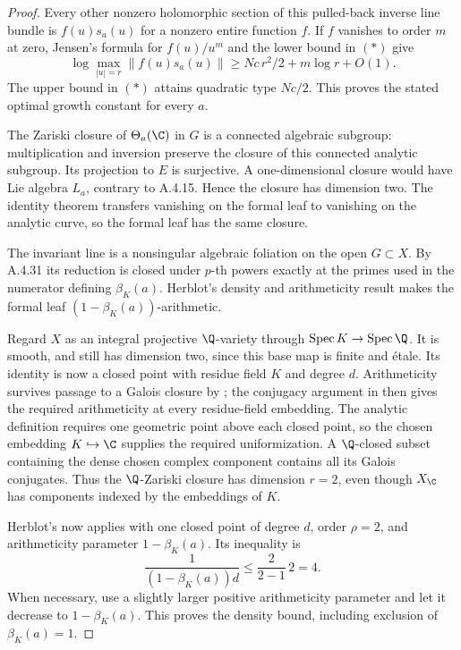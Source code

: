 \begin{proof}
Every other nonzero holomorphic section of this pulled-back
inverse line bundle is $f(u)s_a(u)$ for a nonzero entire
function $f$. If $f$ vanishes to order $m$ at zero, Jensen's
formula for $f(u)/u^m$ and the lower bound in $(*)$ give
\[
 \log\max_{|u|=r}\|f(u)s_a(u)\|
       \ge Nc\,r^2/2+m\log r+O(1).
\]
The upper bound in $(*)$ attains quadratic type $Nc/2$.
This proves the stated optimal growth constant for every $a$.

The Zariski closure of $\Theta_a(\C)$ in $G$ is a connected
algebraic subgroup: multiplication and inversion preserve
the closure of this connected analytic subgroup.
Its projection to $E$ is surjective. A one-dimensional closure
would have Lie algebra $L_a$, contrary to A.4.15. Hence the
closure has dimension two. The identity theorem transfers
vanishing on the formal leaf to vanishing on the analytic curve,
so the formal leaf has the same closure.

The invariant line is a nonsingular algebraic foliation on
the open $G\subset X$. By A.4.31 its reduction is closed under
$p$-th powers exactly at the primes used in the numerator
defining $\beta_K(a)$. Herblot's density and arithmeticity
result \cite[Definition 3.5 and Proposition 3.6, pp.20--21]{EllHerblot2012}
makes the formal leaf $(1-\beta_K(a))$-arithmetic.

Regard $X$ as an integral projective $\Q$-variety through
$\operatorname{Spec}K\to\operatorname{Spec}\Q$. It is smooth,
and still has dimension two, since this base map is finite
and \'etale. Its identity is now a closed point with residue
field $K$ and degree $d$.
Arithmeticity survives passage to a Galois closure by
\cite[Lemma 2.6]{EllHerblot2012}; the conjugacy argument
in \cite[Definition 4.6 and its remark, p.28]{EllHerblot2012}
then gives the required arithmeticity at every residue-field
embedding. The analytic definition requires one geometric
point above each closed point, so the chosen embedding
$K\hookrightarrow\C$ supplies the required uniformization.
A $\Q$-closed subset containing the dense chosen complex
component contains all its Galois conjugates. Thus the
$\Q$-Zariski closure has dimension $r=2$, even though
$X_\C$ has components indexed by the embeddings of $K$.

Herblot's \cite[Theorem 6.1, pp.31--32]{EllHerblot2012}
now applies with one closed point of degree $d$, order
$\rho=2$, and arithmeticity parameter $1-\beta_K(a)$.
Its inequality is
\[
 \frac1{(1-\beta_K(a))d}\le
       \frac{2}{2-1}\,2=4.
\]
When necessary, use a slightly larger positive arithmeticity
parameter and let it decrease to $1-\beta_K(a)$.
This proves the density bound, including exclusion of
$\beta_K(a)=1$.
\end{proof}

